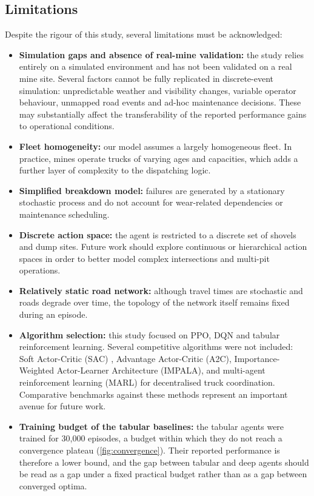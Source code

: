 \documentclass[11pt,a4paper]{article}
\begin{document}
\subsection{Limitations}
\label{sec:limitations}

Despite the rigour of this study, several limitations must be acknowledged:

\begin{itemize}
  \item \textbf{Simulation gaps and absence of real-mine validation:} the study relies entirely on a simulated environment and has not been validated on a real mine site. Several factors cannot be fully replicated in discrete-event simulation: unpredictable weather and visibility changes, variable operator behaviour, unmapped road events and ad-hoc maintenance decisions. These may substantially affect the transferability of the reported performance gains to operational conditions.
  \item \textbf{Fleet homogeneity:} our model assumes a largely homogeneous fleet. In practice, mines operate trucks of varying ages and capacities, which adds a further layer of complexity to the dispatching logic.
  \item \textbf{Simplified breakdown model:} failures are generated by a stationary stochastic process and do not account for wear-related dependencies or maintenance scheduling.
  \item \textbf{Discrete action space:} the agent is restricted to a discrete set of shovels and dump sites. Future work should explore continuous or hierarchical action spaces in order to better model complex intersections and multi-pit operations.
  \item \textbf{Relatively static road network:} although travel times are stochastic and roads degrade over time, the topology of the network itself remains fixed during an episode.
  \item \textbf{Algorithm selection:} this study focused on PPO, DQN and tabular reinforcement learning. Several competitive algorithms were not included: Soft Actor-Critic (SAC) \cite{Haarnoja2018, SampsonNwachukwu2025}, Advantage Actor-Critic (A2C), Importance-Weighted Actor-Learner Architecture (IMPALA), and multi-agent reinforcement learning (MARL) \cite{Zhao2025} for decentralised truck coordination. Comparative benchmarks against these methods represent an important avenue for future work.
  \item \textbf{Training budget of the tabular baselines:} the tabular agents were trained for 30,000 episodes, a budget within which they do not reach a convergence plateau (\cref{fig:convergence}). Their reported performance is therefore a lower bound, and the gap between tabular and deep agents should be read as a gap under a fixed practical budget rather than as a gap between converged optima.

\end{itemize}
\end{document}
